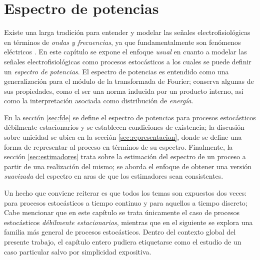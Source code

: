 
\chapter{Espectro de potencias}

Existe una larga tradición para entender y modelar las señales electrofisiológicas en términos de 
\textit{ondas y frecuencias}, ya que fundamentalmente son fenómenos eléctricos \cite{Kaiser00}.
%
%
En este capítulo se expone el enfoque \textit{usual} en cuanto a modelar las señales electrofisiológicas como procesos estocásticos a los cuales se puede definir un \textit{espectro de potencias}.
%
El espectro de potencias es entendido como una generalización para el módulo de la transformada de Fourier; conserva algunas de sus propiedades, como el ser una norma inducida por un producto interno, así como la interpretación asociada como distribución de \textit{energía}.

%
En la sección \ref{sec:fde} se define el espectro de potencias para procesos estocásticos débilmente estacionarios y se establecen condiciones de existencia; la discusión sobre unicidad se ubica en la sección \ref{sec:representacion}, donde se define una forma de representar al proceso en términos de su espectro.
%
Finalmente, la sección \ref{sec:estimadores} trata sobre la estimación del espectro de un proceso a partir de una realización del mismo; se aborda el enfoque de obtener una versión \textit{suavizada} del espectro en aras de que los estimadores sean consistentes.

Un hecho que conviene reiterar es que todos los temas son expuestos dos veces: para procesos estocásticos a tiempo continuo y para aquellos a tiempo discreto; 
%
Cabe mencionar que en este capítulo se trata únicamente el caso de procesos estocásticos \textit{débilmente estacionarios}, mientras que en el siguiente se explora una familia más general de procesos estocásticos.
%
Dentro del contexto global del presente trabajo, el capítulo entero pudiera etiquetarse como el estudio de un caso particular salvo por simplicidad expositiva.

